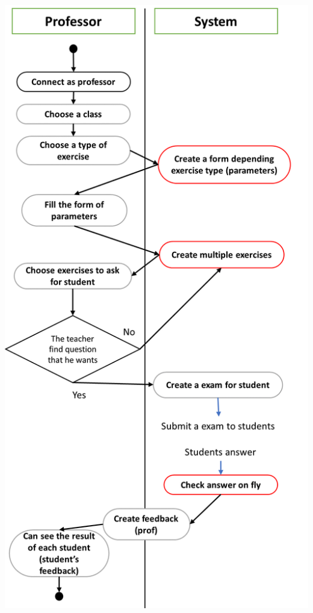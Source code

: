 \documentclass{article}
\begin{document}
\begin{center}
    \includegraphics[scale=0.40]{profAD.png}
\end{center}
\end{document}

